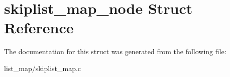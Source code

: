 \hypertarget{structskiplist__map__node}{}\section{skiplist\+\_\+map\+\_\+node Struct Reference}
\label{structskiplist__map__node}


The documentation for this struct was generated from the following file\+:\begin{DoxyCompactItemize}
\item 
list\+\_\+map/skiplist\+\_\+map.\+c\end{DoxyCompactItemize}
